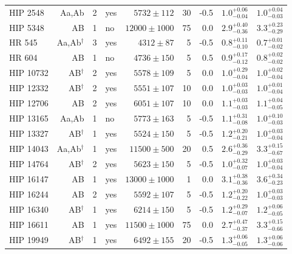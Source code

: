 \begin{scriptsize}
\begin{longtable}{|l|rrlrrrll|}
   HIP 2548 & Aa,Ab &     2 & yes &  $5732 \pm 112$ &      30 &    -0.5  &  $1.0^{+0.06}_{-0.04}$ &  $1.0^{+0.04}_{-0.03}$ \\
   HIP 5348 & AB &     1 & no &  $12000 \pm 1000$ &     75 &     0.0 &  $2.9^{+0.40}_{-0.36}$ &  $3.3^{+0.23}_{-0.29}$ \\
     HR 545 & Aa,Ab$^{\dagger}$ &     3 & yes &   $4312 \pm 87$ &       5 &    -0.5  &  $0.8^{+0.11}_{-0.10}$ &  $0.7^{+0.01}_{-0.02}$ \\
     HR 604 & AB &     1 & no &  $4736 \pm 150$ &       5 &     0.5  &    $0.9^{+0.17}_{-0.12}$ &  $0.8^{+0.02}_{-0.02}$ \\
  HIP 10732 & AB$^{\dagger}$ &     2 & yes &  $5578 \pm 109$ &       5 &     0.0  &  $1.0^{+0.29}_{-0.04}$ &  $1.0^{+0.02}_{-0.04}$ \\
  HIP 12332 & AB$^{\dagger}$ &     2 & yes &  $5551 \pm 107$ &      10 &     0.0  &    $1.0^{+0.03}_{-0.03}$ &  $1.0^{+0.01}_{-0.04}$ \\
  HIP 12706 & AB &     2 & yes &  $6051 \pm 107$ &      10 &     0.0  &  $1.1^{+0.03}_{-0.03}$ &  $1.1^{+0.04}_{-0.05}$ \\
  HIP 13165 & Aa,Ab &     1 & no &  $5773 \pm 163$ &       5 &    -0.5  &  $1.1^{+0.31}_{-0.08}$ &  $1.0^{+0.10}_{-0.03}$ \\
  HIP 13327 & AB$^{\dagger}$ &     1 & yes &  $5524 \pm 150$ &       5 &    -0.5  &  $1.2^{+0.20}_{-0.21}$ &  $1.0^{+0.03}_{-0.04}$ \\
  HIP 14043 & Aa,Ab$^{\dagger}$ &     1 & yes &  $11500 \pm 500$ &       20 &    0.5  &  $2.6^{+0.36}_{-0.29}$ &  $3.3^{+0.15}_{-0.67}$ \\
  HIP 14764 & AB$^{\dagger}$ &     2 & yes &  $5623 \pm 150$ &      5 &     -0.5 &    $1.0^{+0.32}_{-0.07}$ &  $1.0^{+0.03}_{-0.04}$ \\
  HIP 16147 & AB &     1 & yes &  $13000 \pm 1000$ &      1 &     0.0 &  $3.1^{+0.38}_{-0.36}$ &  $3.6^{+0.34}_{-0.23}$ \\
  HIP 16244 & AB &     2 & yes &  $5592 \pm 107$ &       5 &    -0.5  &  $1.2^{+0.20}_{-0.22}$ &  $1.0^{+0.03}_{-0.03}$ \\
  HIP 16340 & AB$^{\dagger}$ &     1 & yes &  $6214 \pm 150$ &       5 &    -0.5  &  $1.2^{+0.29}_{-0.07}$ &  $1.2^{+0.06}_{-0.05}$ \\
  HIP 16611 & AB &     1 & yes &  $11500 \pm 1000$ &     75 &     0.0 &  $2.7^{+0.47}_{-0.37}$ &  $3.3^{+0.15}_{-0.66}$ \\
  HIP 19949 & AB$^{\dagger}$ &     1 & yes &  $6492 \pm 155$ &      20 &    -0.5  &  $1.3^{+0.06}_{-0.05}$ &  $1.3^{+0.06}_{-0.06}$ \\

\end{longtable}
\end{scriptsize}
